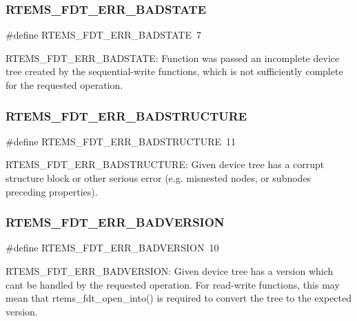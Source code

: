 \subsubsection{\texorpdfstring{RTEMS\_FDT\_ERR\_BADSTATE}{RTEMS\_FDT\_ERR\_BADSTATE}}
{\footnotesize\ttfamily \#define R\+T\+E\+M\+S\+\_\+\+F\+D\+T\+\_\+\+E\+R\+R\+\_\+\+B\+A\+D\+S\+T\+A\+TE~7}

R\+T\+E\+M\+S\+\_\+\+F\+D\+T\+\_\+\+E\+R\+R\+\_\+\+B\+A\+D\+S\+T\+A\+TE\+: Function was passed an incomplete device tree created by the sequential-\/write functions, which is not sufficiently complete for the requested operation. \mbox{\label{rtems-fdt_8h_ad6f0a6ee11fdd227e8e95088edfb4d8f}} 
\subsubsection{\texorpdfstring{RTEMS\_FDT\_ERR\_BADSTRUCTURE}{RTEMS\_FDT\_ERR\_BADSTRUCTURE}}
{\footnotesize\ttfamily \#define R\+T\+E\+M\+S\+\_\+\+F\+D\+T\+\_\+\+E\+R\+R\+\_\+\+B\+A\+D\+S\+T\+R\+U\+C\+T\+U\+RE~11}

R\+T\+E\+M\+S\+\_\+\+F\+D\+T\+\_\+\+E\+R\+R\+\_\+\+B\+A\+D\+S\+T\+R\+U\+C\+T\+U\+RE\+: Given device tree has a corrupt structure block or other serious error (e.\+g. misnested nodes, or subnodes preceding properties). \mbox{\label{rtems-fdt_8h_af1335b18e4b59d15f05fc888cb2725dc}} 
\subsubsection{\texorpdfstring{RTEMS\_FDT\_ERR\_BADVERSION}{RTEMS\_FDT\_ERR\_BADVERSION}}
{\footnotesize\ttfamily \#define R\+T\+E\+M\+S\+\_\+\+F\+D\+T\+\_\+\+E\+R\+R\+\_\+\+B\+A\+D\+V\+E\+R\+S\+I\+ON~10}

R\+T\+E\+M\+S\+\_\+\+F\+D\+T\+\_\+\+E\+R\+R\+\_\+\+B\+A\+D\+V\+E\+R\+S\+I\+ON\+: Given device tree has a version which can\textquotesingle{}t be handled by the requested operation. For read-\/write functions, this may mean that rtems\+\_\+fdt\+\_\+open\+\_\+into() is required to convert the tree to the expected version. \mbox{\label{rtems-fdt_8h_a7077da16961f22b6a669f42e14754a19}} 
